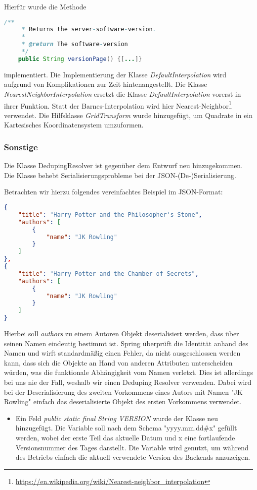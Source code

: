 Hierfür wurde die Methode
\begin{lstlisting}[language=java]
    /**
     * Returns the server-software-version.
     * 
     * @return The software-version
     */
    public String versionPage() {[...]}
\end{lstlisting}
implementiert.
Die Implementierung der Klasse \textit{DefaultInterpolation} wird aufgrund von Komplikationen zur Zeit hintenangestellt.
\noChange
{}
Die Klasse \textit{NearestNeighborInterpolation} ersetzt die Klasse \textit{DefaultInterpolation} vorerst in ihrer Funktion.
Statt der Barnes-Interpolation wird hier Nearest-Neighbor\footnote{\url{https://en.wikipedia.org/wiki/Nearest-neighbor_interpolation}} verwendet.
Die Hilfsklasse \textit{GridTransform} wurde hinzugefügt, um Quadrate in ein Kartesisches Koordinatensystem umzuformen.



\subsubsection{Sonstige}
Die Klasse DedupingResolver ist gegenüber dem Entwurf neu hinzugekommen.
\\
Die Klasse behebt Serialisierungsprobleme bei der \gls{JSON}-(De-)Serialisierung.

Betrachten wir hierzu folgendes vereinfachtes Beispiel im \gls{JSON}-Format:
\begin{lstlisting}[frame=single, language=json]
{
    "title": "Harry Potter and the Philosopher's Stone",
    "authors": [
        {
            "name": "JK Rowling"
        }
    ]
},
{
    "title": "Harry Potter and the Chamber of Secrets",
    "authors": [
        {
            "name": "JK Rowling"
        }
    ]
}
\end{lstlisting}
Hierbei soll \textit{authors} zu einem Autoren Objekt deserialisiert werden, dass über seinen Namen eindeutig bestimmt ist.
Spring überprüft die Identität anhand des Namen und wirft standardmäßig einen Fehler, da nicht ausgeschlossen werden kann, dass sich die Objekte an Hand von anderen Attributen unterscheiden würden, was die funktionale Abhängigkeit vom Namen verletzt.
Dies ist allerdings bei uns nie der Fall, weshalb wir einen Deduping Resolver verwenden.
Dabei wird bei der Deserialisierung des zweiten Vorkommens eines Autors mit Namen "JK Rowling" einfach das deserialisierte Objekt des ersten Vorkommens verwendet.
\noChange
{}
\begin{itemize}[noitemsep]
    \item Ein Feld \textit{public static final String VERSION} wurde der Klasse neu hinzugefügt. Die Variable soll nach dem Schema "yyyy.mm.dd\#x" gefüllt werden, wobei der erste Teil das aktuelle Datum und x eine fortlaufende Versionsnummer des Tages darstellt. Die Variable wird genutzt, um während des Betriebs einfach die aktuell verwendete Version des Backends anzuzeigen.
\end{itemize}
